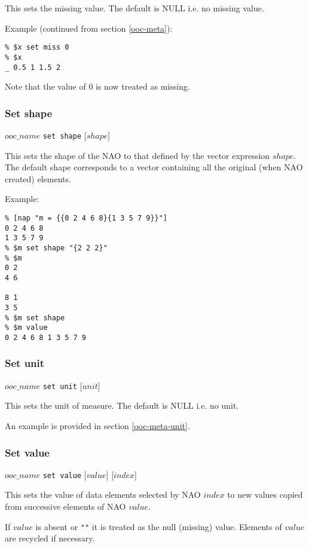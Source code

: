 This sets the missing value. The default is NULL i.e. no missing
  value.
  
Example (continued from section \ref{ooc-meta}):
  \begin{verbatim}
% $x set miss 0
% $x
_ 0.5 1 1.5 2
\end{verbatim}

Note that the value of 0 is now treated as missing.

\subsubsection{Set shape}
    \label{ooc-modify-set-shape}

$ooc\_name$ \texttt{set shape} [$shape$]

This sets the shape of the NAO to that defined by the vector expression $shape$.
The default shape corresponds to a vector containing all the original (when NAO created) elements.
  
Example:
  \begin{verbatim}
% [nap "m = {{0 2 4 6 8}{1 3 5 7 9}}"]
0 2 4 6 8
1 3 5 7 9
% $m set shape "{2 2 2}"
% $m
0 2
4 6

8 1
3 5
% $m set shape
% $m value
0 2 4 6 8 1 3 5 7 9
\end{verbatim}

\subsubsection{Set unit}
    \label{ooc-modify-set-unit}

$ooc\_name$ \texttt{set unit} [$unit$]

This sets the unit of measure. The default is NULL i.e. no
  unit.
  

An example is provided in section \ref{ooc-meta-unit}.

\subsubsection{Set value}
    \label{ooc-modify-set-value}

$ooc\_name$ \texttt{set value} [$value$] [$index$]

This sets the value of data elements selected by NAO 
  $index$ to new values copied from successive elements of NAO
  $value$.
  

If 
  $value$ is absent or 
  \texttt{""} it is treated as the null (missing) value.
  Elements of 
  $value$ are recycled if necessary.
  

